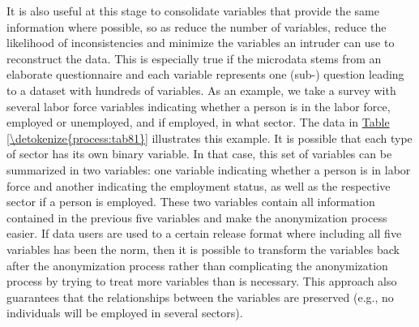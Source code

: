 \documentclass[letterpaper,10pt,english]{sphinxmanual}
\begin{document}
It is also useful at this stage to consolidate variables that provide
the same information where possible, so as reduce the number of
variables, reduce the likelihood of inconsistencies and minimize the
variables an intruder can use to reconstruct the data. This is
especially true if the microdata stems from an elaborate questionnaire
and each variable represents one (sub-) question leading to a dataset
with hundreds of variables. As an example, we take a survey with several
labor force variables indicating whether a person is in the labor force,
employed or unemployed, and if employed, in what sector. The data in
\hyperref[\detokenize{process:tab81}]{Table \ref{\detokenize{process:tab81}}} illustrates this example. It is possible that each type of
sector has its own binary variable. In that case, this set of variables
can be summarized in two variables: one variable indicating whether a
person is in labor force and another indicating the employment status,
as well as the respective sector if a person is employed. These two
variables contain all information contained in the previous five
variables and make the anonymization process easier. If data users are
used to a certain release format where including all five variables has
been the norm, then it is possible to transform the variables back after
the anonymization process rather than complicating the anonymization
process by trying to treat more variables than is necessary. This
approach also guarantees that the relationships between the variables
are preserved (e.g., no individuals will be employed in several
sectors).
\end{document}
